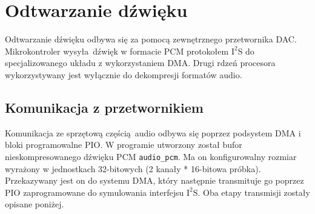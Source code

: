 \documentclass[polish]{aghengthesis}
\newcommand{\imgint}[4]{
	\begin{figure}[{#4}]
		\centering
		\texttt{[image: \#1]}
		\caption{#2}
		\label{#1}
	\end{figure}
}
\newcommand{\imgcs}[3]{\imgint{#1}{#2}{#3}{}}
\newcommand{\isqs}{$\text{I}^{2}\text{S}$}
\begin{document}
	\section{Odtwarzanie dźwięku}
%		
%		
%		
		
		
			
		Odtwarzanie dźwięku odbywa się za pomocą zewnętrznego przetwornika DAC. Mikrokontroler wysyła dźwięk w formacie PCM protokołem \isqs{} do specjalizowanego układu z wykorzystaniem DMA. Drugi rdzeń procesora wykorzystywany jest wyłącznie do dekompresji formatów audio.
		
		
		\subsection{Komunikacja z przetwornikiem}
			Komunikacja ze sprzętową częścią audio odbywa się poprzez podsystem DMA i bloki programowalne PIO.
			W programie utworzony został bufor nieskompresowanego dźwięku PCM \lstinline|audio_pcm|. Ma on konfigurowalny rozmiar wyrażony w jednostkach 32-bitowych (2 kanały * 16-bitowa próbka). Przekazywany jest on do systemu DMA, który następnie transmituje go poprzez PIO zaprogramowane do symulowania interfejsu \isqs{}. Oba etapy transmisji zostały opisane poniżej.
		
\end{document}
